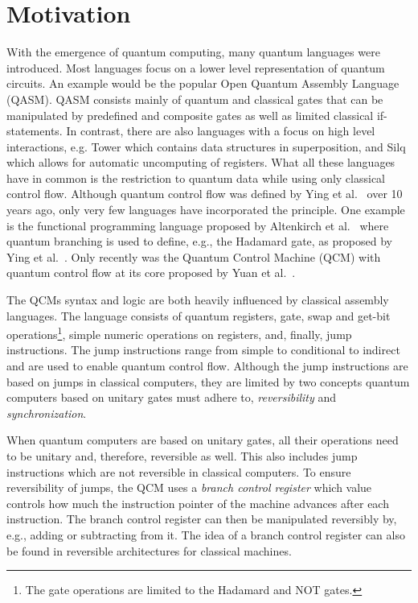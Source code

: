 \chapter{Motivation}
With the emergence of quantum computing, many quantum languages were introduced. Most languages focus on a lower level representation of quantum circuits. An example would be the popular Open Quantum Assembly Language (QASM)\cite{CBSG17}. QASM consists mainly of quantum and classical gates that can be manipulated by predefined and composite gates as well as limited classical if-statements. In contrast, there are also languages with a focus on high level interactions, e.g. Tower\cite{ChMi22} which contains data structures in superposition, and Silq~\cite{BBGV20} which allows for automatic uncomputing of registers. What all these languages have in common is the restriction to quantum data while using only classical control flow. Although quantum control flow was defined by Ying et al.~\cite{YYF12} over 10 years ago, only very few languages have incorporated the principle. One example is the functional programming language proposed by Altenkirch et al.~\cite{AlGr05} where quantum branching is used to define, e.g., the Hadamard gate, as proposed by Ying et al.~\cite{YYF12}. Only recently was the Quantum Control Machine (QCM) with quantum control flow at its core proposed by Yuan et al.~\cite{YVC24}. 

The QCMs syntax and logic are both heavily influenced by classical assembly languages. The language consists of quantum registers, gate, swap and get-bit operations\footnote{The gate operations are limited to the Hadamard and NOT gates.}, simple numeric operations on registers, and, finally, jump instructions. The jump instructions range from simple to conditional to indirect and are used to enable quantum control flow. Although the jump instructions are based on jumps in classical computers, they are limited by two concepts quantum computers based on unitary gates must adhere to, \emph{reversibility} and \emph{synchronization}.~\cite{YVC24}

When quantum computers are based on unitary gates, all their operations need to be unitary and, therefore, reversible as well. This also includes jump instructions which are not reversible in classical computers. To ensure reversibility of jumps, the QCM uses a \emph{branch control register} which value controls how much the instruction pointer of the machine advances after each instruction. The branch control register can then be manipulated reversibly by, e.g., adding or subtracting from it. The idea of a branch control register can also be found in reversible architectures for classical machines\cite{AGY07, TAG12}.

